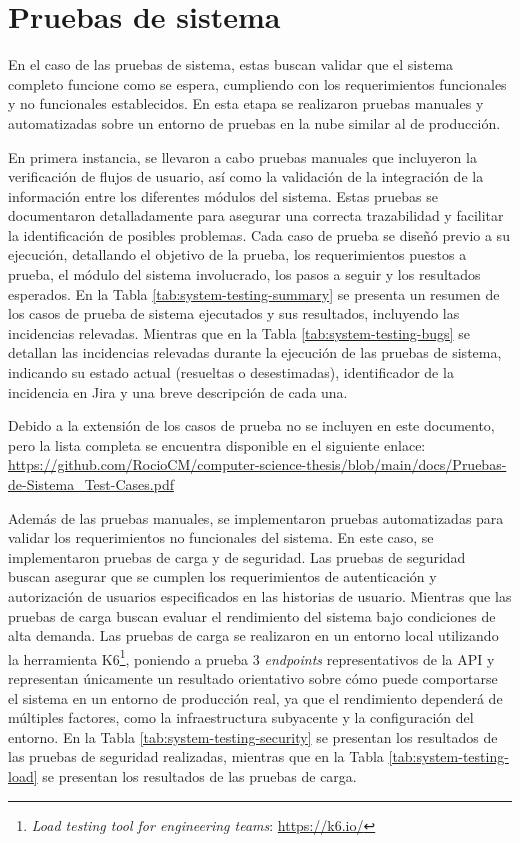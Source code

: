 \section{Pruebas de sistema}

En el caso de las pruebas de sistema, estas buscan validar que el sistema completo funcione como se espera, cumpliendo con los requerimientos funcionales y no funcionales establecidos. En esta etapa se realizaron pruebas manuales y automatizadas sobre un entorno de pruebas en la nube similar al de producción.

En primera instancia, se llevaron a cabo pruebas manuales que incluyeron la verificación de flujos de usuario, así como la validación de la integración de la información entre los diferentes módulos del sistema. Estas pruebas se documentaron detalladamente para asegurar una correcta \gls{trazabilidad} y facilitar la identificación de posibles problemas. Cada caso de prueba se diseñó previo a su ejecución, detallando el objetivo de la prueba, los requerimientos puestos a prueba, el módulo del sistema involucrado, los pasos a seguir y los resultados esperados. En la Tabla \ref{tab:system-testing-summary} se presenta un resumen de los casos de prueba de sistema ejecutados y sus resultados, incluyendo las incidencias relevadas. Mientras que en la Tabla \ref{tab:system-testing-bugs} se detallan las incidencias relevadas durante la ejecución de las pruebas de sistema, indicando su estado actual (resueltas o desestimadas), identificador de la incidencia en Jira y una breve descripción de cada una.

Debido a la extensión de los casos de prueba no se incluyen en este documento, pero la lista completa se encuentra disponible en el siguiente enlace: \url{https://github.com/RocioCM/computer-science-thesis/blob/main/docs/Pruebas-de-Sistema_Test-Cases.pdf}

Además de las pruebas manuales, se implementaron pruebas automatizadas para validar los requerimientos no funcionales del sistema. En este caso, se implementaron pruebas de carga y de seguridad. Las pruebas de seguridad buscan asegurar que se cumplen los requerimientos de autenticación y autorización de usuarios especificados en las historias de usuario. Mientras que las pruebas de carga buscan evaluar el rendimiento del sistema bajo condiciones de alta demanda. Las pruebas de carga se realizaron en un entorno local utilizando la herramienta K6\footnote{\textit{Load testing tool for engineering teams}: \url{https://k6.io/}}, poniendo a prueba 3 \textit{endpoints} representativos de la API y representan únicamente un resultado orientativo sobre cómo puede comportarse el sistema en un entorno de producción real, ya que el rendimiento dependerá de múltiples factores, como la infraestructura subyacente y la configuración del entorno. En la Tabla \ref{tab:system-testing-security} se presentan los resultados de las pruebas de seguridad realizadas, mientras que en la Tabla \ref{tab:system-testing-load} se presentan los resultados de las pruebas de carga.

